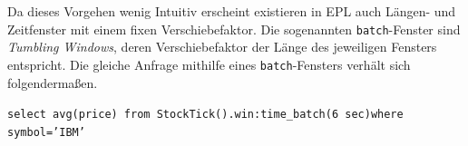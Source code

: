 \documentclass{acm_proc_article-sp}
\begin{document}
\begin{table}[ht]
    \caption{Fenster ohne Verschiebefaktor}
    \label{table:ereignis}\vspace{0.2cm}
\end{table}

Da dieses Vorgehen wenig Intuitiv erscheint existieren in EPL auch Längen- und 
Zeitfenster mit einem fixen Verschiebefaktor. Die sogenannten \texttt{batch}-Fenster sind 
\textit{Tumbling Windows}, deren Verschiebefaktor der Länge des jeweiligen Fensters 
entspricht. Die gleiche Anfrage mithilfe eines \texttt{batch}-Fensters verhält sich 
folgendermaßen.

\texttt{select  avg(price) from StockTick().win:time\_batch(6 sec)where symbol='IBM'}

\begin{table}[ht]
    \caption{\texttt{batch}-Fenster}
    \label{table:ereignis-batch}\vspace{0.2cm}
\end{table}
\end{document}
